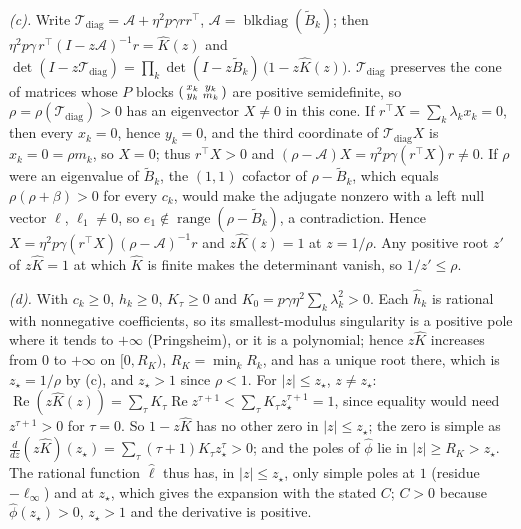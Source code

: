 \documentclass[11pt]{article}
\theoremstyle{remark}
\newcommand{\T}{\mathcal T}
\begin{document}
\emph{(c).} Write $\T_{\mathrm{diag}}=\mathcal A+\eta^2p\gamma rr^\top$, $\mathcal A=\operatorname{blkdiag}(\widetilde B_k)$; then $\eta^2p\gamma\,r^\top(I-z\mathcal A)^{-1}r=\widehat K(z)$ and $\det(I-z\T_{\mathrm{diag}})=\prod_k\det(I-z\widetilde B_k)\,\big(1-z\widehat K(z)\big)$. $\T_{\mathrm{diag}}$ preserves the cone of matrices whose $P$ blocks $\begin{psmallmatrix}x_k&y_k\\y_k&m_k\end{psmallmatrix}$ are positive semidefinite, so $\rho=\rho(\T_{\mathrm{diag}})>0$ has an eigenvector $X\ne0$ in this cone. If $r^\top X=\sum_k\lambda_kx_k=0$, then every $x_k=0$, hence $y_k=0$, and the third coordinate of $\T_{\mathrm{diag}}X$ is $x_k=0=\rho m_k$, so $X=0$; thus $r^\top X>0$ and $(\rho-\mathcal A)X=\eta^2p\gamma(r^\top X)r\ne0$. If $\rho$ were an eigenvalue of $\widetilde B_k$, the $(1,1)$ cofactor of $\rho-\widetilde B_k$, which equals $\rho(\rho+\beta)>0$ for every $c_k$, would make the adjugate nonzero with a left null vector $\ell$, $\ell_1\ne0$, so $e_1\notin\operatorname{range}(\rho-\widetilde B_k)$, a contradiction. Hence $X=\eta^2p\gamma(r^\top X)(\rho-\mathcal A)^{-1}r$ and $z\widehat K(z)=1$ at $z=1/\rho$. Any positive root $z'$ of $z\widehat K=1$ at which $\widehat K$ is finite makes the determinant vanish, so $1/z'\le\rho$.

\emph{(d).} With $c_k\ge0$, $h_k\ge0$, $K_\tau\ge0$ and $K_0=p\gamma\eta^2\sum_k\lambda_k^2>0$. Each $\widehat h_k$ is rational with nonnegative coefficients, so its smallest-modulus singularity is a positive pole where it tends to $+\infty$ (Pringsheim), or it is a polynomial; hence $z\widehat K$ increases from $0$ to $+\infty$ on $[0,R_K)$, $R_K=\min_k R_k$, and has a unique root there, which is $z_\star=1/\rho$ by (c), and $z_\star>1$ since $\rho<1$. For $|z|\le z_\star$, $z\ne z_\star$: $\operatorname{Re}(z\widehat K(z))=\sum_\tau K_\tau\operatorname{Re}z^{\tau+1}<\sum_\tau K_\tau z_\star^{\tau+1}=1$, since equality would need $z^{\tau+1}>0$ for $\tau=0$. So $1-z\widehat K$ has no other zero in $|z|\le z_\star$; the zero is simple as $\frac{d}{dz}(z\widehat K)(z_\star)=\sum_\tau(\tau+1)K_\tau z_\star^\tau>0$; and the poles of $\widehat\phi$ lie in $|z|\ge R_K>z_\star$. The rational function $\widehat\ell$ thus has, in $|z|\le z_\star$, only simple poles at $1$ (residue $-\ell_\infty$) and at $z_\star$, which gives the expansion with the stated $C$; $C>0$ because $\widehat\phi(z_\star)>0$, $z_\star>1$ and the derivative is positive.
\end{document}
